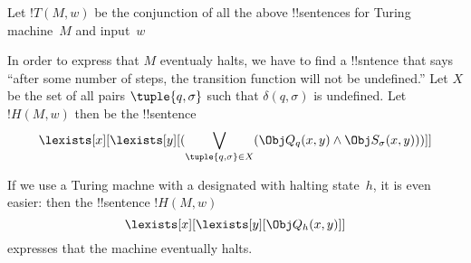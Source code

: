 \documentclass[../../../include/open-logic-section]{subfiles}
\begin{document}

Let $!T(M, w)$ be the conjunction of all the above !!{sentence}s for Turing
machine~$M$ and input~$w$

In order to express that $M$ eventualy halts, we have to find a
!!{sntence} that says ``after some number of steps, the transition
function will not be undefined.''  Let $X$ be the set of all pairs
$\tuple{q, \sigma}$ such that $\delta(q, \sigma)$ is undefined.  Let
$!H(M, w)$ then be the !!{sentence}
\[
\lexists[x][\lexists[y][(\bigvee_{\tuple{q, \sigma} \in
      X}(\Obj Q_q(x, y) \land \Obj S_\sigma(x, y)))]]
\]

If we use a Turing machne with a designated with halting state~$h$, it
is even easier: then the !!{sentence} $!H(M, w)$
\[
\lexists[x][\lexists[y][\Obj Q_h(x, y)]]
\]
expresses that the machine eventually halts.
\end{document}
